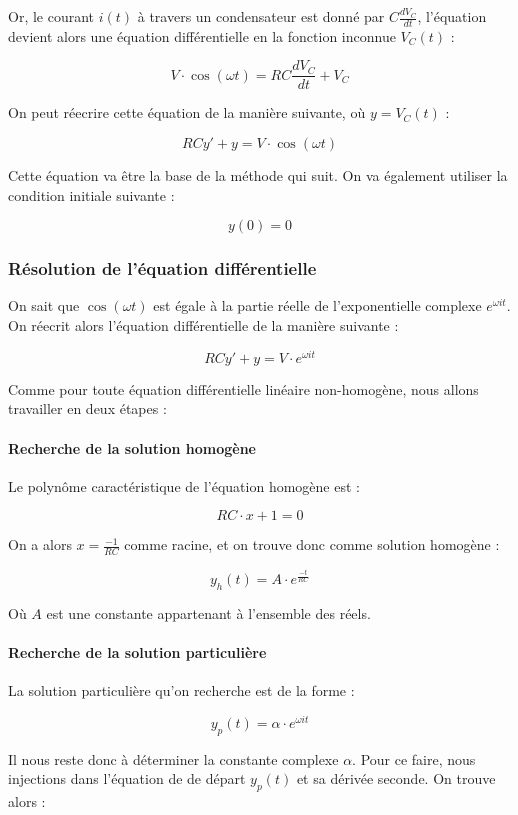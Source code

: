 Or, le courant $i(t)$ à travers un condensateur est donné par $C \frac{dV_C}{dt}$, 
l'équation devient alors une équation différentielle en la fonction inconnue $V_C (t)$ :

$$V \cdot \cos (\omega t) = RC\frac{dV_C}{dt}  + V_C$$

On peut réecrire cette équation de la manière suivante, où $y = V_C(t)$ :

$$RCy' + y = V \cdot \cos (\omega t)$$

Cette équation va être la base de la méthode qui suit. On va également utiliser 
la condition initiale suivante :

$$y(0) = 0$$

\subsubsection{Résolution de l'équation différentielle}

On sait que $\cos (\omega t)$ est égale à la partie réelle de l'exponentielle
complexe $e^{\omega i t}$. On réecrit alors l'équation différentielle de la
manière suivante :

$$RCy' + y = V \cdot e^{\omega i t}$$

Comme pour toute équation différentielle linéaire non-homogène, nous allons travailler
en deux étapes :

\paragraph{Recherche de la solution homogène}

Le polynôme caractéristique de l'équation homogène est :

$$RC \cdot x + 1 = 0$$

On a alors $x = \frac{-1}{RC}$ comme racine, et on trouve donc comme solution homogène :

$$y_h(t) = A \cdot e^{\frac{-t}{RC}}$$

Où $A$ est une constante appartenant à l'ensemble des réels. %

\paragraph{Recherche de la solution particulière}

La solution particulière qu'on recherche est de la forme :

$$y_p(t) = \alpha \cdot e^{\omega i t}$$

Il nous reste donc à déterminer la constante complexe $\alpha$. Pour ce faire,
nous injections dans l'équation de de départ $y_p(t)$ et sa dérivée seconde. On
trouve alors :

